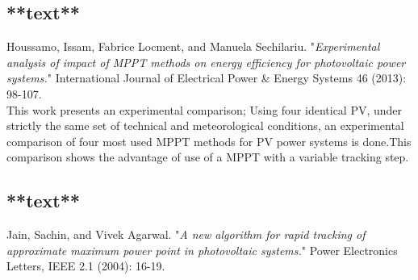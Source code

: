 







\subsection{**text**\cite{houssamo2013experimental}}

Houssamo, Issam, Fabrice Locment, and Manuela Sechilariu. "\textit{Experimental analysis of impact of MPPT methods on energy efficiency for photovoltaic power systems.}" International Journal of Electrical Power \& Energy Systems 46 (2013): 98-107.\\

This work presents an experimental comparison; Using four identical PV, under strictly the same set of technical and meteorological conditions, an experimental comparison  of four most used MPPT methods for PV power systems is done.This comparison shows the advantage of use of a MPPT with a variable tracking step.\\  

\subsection{**text**\cite{jain2004new}}
Jain, Sachin, and Vivek Agarwal. "\textit{A new algorithm for rapid tracking of approximate maximum power point in photovoltaic systems.}" Power Electronics Letters, IEEE 2.1 (2004): 16-19.\\

